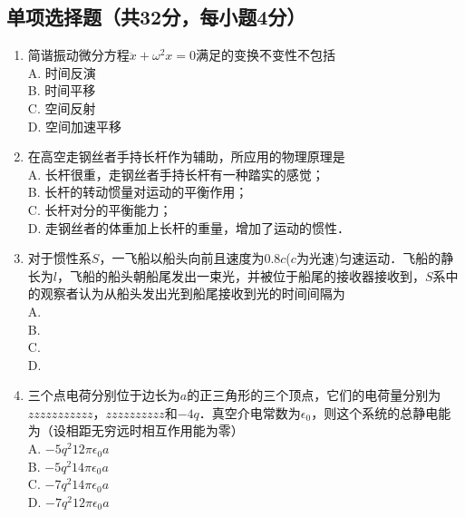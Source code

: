 
\begin{issues}
\issueDraft
\issueTODO
\end{issues}



\subsection{单项选择题（共32分，每小题4分）}
\begin{enumerate}
\item 简谐振动微分方程$\ddot{x}+{\omega}^2{x}=0$满足的变换不变性不包括\\
A. 时间反演\\
B. 时间平移\\
C. 空间反射\\
D. 空间加速平移\\

\item 在高空走钢丝者手持长杆作为辅助，所应用的物理原理是\\
A. 长杆很重，走钢丝者手持长杆有一种踏实的感觉；\\
B. 长杆的转动惯量对运动的平衡作用；\\
C. 长杆对分的平衡能力；\\
D. 走钢丝者的体重加上长杆的重量，增加了运动的惯性．\\

\item 对于惯性系$S$，一飞船以船头向前且速度为0.8$c$($c$为光速)匀速运动．飞船的静长为$l$，飞船的船头朝船尾发出一束光，并被位于船尾的接收器接收到，$S$系中的观察者认为从船头发出光到船尾接收到光的时间间隔为\\
A. \\
B. \\
C. \\
D. \\

\item 三个点电荷分别位于边长为$a$的正三角形的三个顶点，它们的电荷量分别为$zzzzzzzzzzz$，$zzzzzzzzzz$和$-4q$．真空介电常数为$\epsilon_{0}$，则这个系统的总静电能为（设相距无穷远时相互作用能为零）\\
A. $-5q^{2}12\pi \epsilon_{0} a$\\
B. $-5q^{2}14\pi \epsilon_{0} a$\\
C. $-7q^{2}14\pi \epsilon_{0} a$\\
D. $-7q^{2}12\pi \epsilon_{0} a$\\


\end{enumerate}
